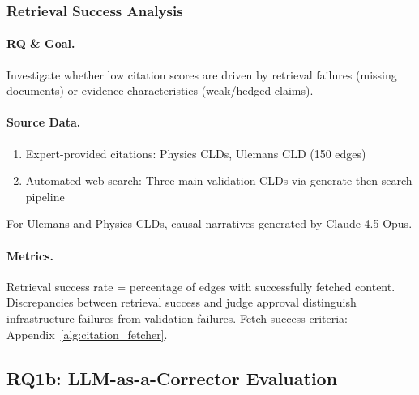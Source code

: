 \subsubsection{Retrieval Success Analysis}
\label{sec:retrieval_success}

\paragraph{RQ \& Goal.}
Investigate whether low citation scores are driven by retrieval failures (missing documents) or evidence characteristics (weak/hedged claims).

\paragraph{Source Data.}
\begin{enumerate}[noitemsep]
    \item Expert-provided citations: Physics CLDs, Ulemans CLD (150 edges)
    \item Automated web search: Three main validation CLDs via generate-then-search pipeline
\end{enumerate}
For Ulemans and Physics CLDs, causal narratives generated by Claude 4.5 Opus.

\paragraph{Metrics.}
Retrieval success rate = percentage of edges with successfully fetched content. Discrepancies between retrieval success and judge approval distinguish infrastructure failures from validation failures. Fetch success criteria: Appendix~\ref{alg:citation_fetcher}.

\subsection{RQ1b: LLM-as-a-Corrector Evaluation}
\label{sec:rq1b}
\label{sec:rq1b_experiments}

